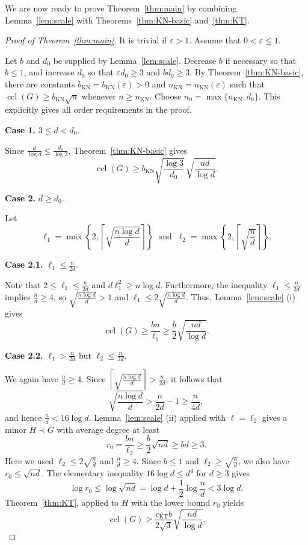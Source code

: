 \documentclass[11pt,a4paper]{article}
\theoremstyle{definition}
\theoremstyle{remark}
\DeclareMathOperator{\ccl}{ccl}
\newcommand{\eps}{\varepsilon}
\begin{document}
We are now ready to prove Theorem~\ref{thm:main} by combining Lemma~\ref{lem:scale} with Theorems~\ref{thm:KN-basic} and~\ref{thm:KT}.

\begin{proof}[Proof of Theorem~\ref{thm:main}] It is trivial if 
$\eps>1$. Assume that
$0<\eps\le1$.

Let $b$ and $d_0$ be supplied by Lemma~\ref{lem:scale}. Decrease $b$
if necessary so that $b\le1$, and increase $d_0$ so that
$\eps d_0\ge3$ and $bd_0\ge3$. By
Theorem~\ref{thm:KN-basic}, there are constants
$b_{\mathrm{KN}}=b_{\mathrm{KN}}(\eps)>0$ and
$n_{\mathrm{KN}}=n_{\mathrm{KN}}(\eps)$ such that
$\ccl(G)\ge b_{\mathrm{KN}}\sqrt n$ whenever $n\ge n_{\mathrm{KN}}$.
Choose $n_0=\max\{n_{\mathrm{KN}},d_0\}$.
This explicitly gives all order requirements in the proof.

\noindent
{\bf Case 1.} 
 $3\le d<d_0$. 

Since
$\frac{d}{\log d}\le\frac{d_0}{\log 3}$,
Theorem~\ref{thm:KN-basic} gives
\[
 \ccl(G)\ge b_{\mathrm{KN}}\sqrt{\frac{\log 3}{d_0}}\,
                 \sqrt{\frac{nd}{\log d}}.
\]

\noindent
{\bf Case 2.} $d\ge d_0$. 

Let
\[
 \ell_1=\max\left\{2,
        \left\lceil\sqrt{\frac{n\log d}{d}}\right\rceil\right\}
 \ \text{ and }\ 
 \ell_2=\max\left\{2,
        \left\lceil\sqrt{\frac{n}{d}}\right\rceil\right\}.
\]

\noindent
{\bf Case 2.1.} $\ell_1\le\frac{n}{2d}$. 

Note that
$2\le\ell_1\le\frac{n}{2d}$ and $d\ell_1^2\ge n\log d$.
Furthermore, the inequality $\ell_1\le\frac{n}{2d}$ implies
$\frac{n}{d}\ge4$, so
$\sqrt{\frac{n\log d}{d}}>1$ and
$\ell_1\le2\sqrt{\frac{n\log d}{d}}$. Thus, 
Lemma~\ref{lem:scale} (i) gives
\[
 \ccl(G)\ge\frac{bn}{\ell_1}
 \ge\frac{b}{2}\sqrt{\frac{nd}{\log d}}.
\]

\noindent
{\bf Case 2.2.}  $\ell_1>\frac{n}{2d}$ but
$\ell_2\le\frac{n}{2d}$. 

We again have $\frac{n}{d}\ge4$.
Since
$\left\lceil\sqrt{\frac{n\log d}{d}}\right\rceil
>\frac{n}{2d}$, it follows that
\[
 \sqrt{\frac{n\log d}{d}}>\frac{n}{2d}-1
 \ge\frac{n}{4d},
\]
and hence $\frac{n}{d}<16\log d$. 
Lemma~\ref{lem:scale} (ii) applied with $\ell=\ell_2$
gives a minor $H\prec G$ with average degree at least
\[
 r_0=\frac{bn}{\ell_2}\ge\frac{b}{2}\sqrt{nd}\ge bd\ge3.
\]
Here we used $\ell_2\le2\sqrt{\frac{n}{d}}$ and
$\frac{n}{d}\ge4$. Since $b\le1$ and
$\ell_2\ge\sqrt{\frac{n}{d}}$, we also have
$r_0\le\sqrt{nd}$. The elementary inequality
$16\log d\le d^4$ for $d\ge3$ gives
\[
 \log r_0\le\log\sqrt{nd}
 =\log d+\frac{1}{2}\log \frac{n}{d} <3\log d.
\]
Theorem~\ref{thm:KT}, applied to $H$ with the lower bound $r_0$
yields
\[
 \ccl(G)\ge\frac{c_{\mathrm{KT}}b}{2\sqrt{3}}
             \sqrt{\frac{nd}{\log d}}.
\]


\end{proof}
\end{document}
